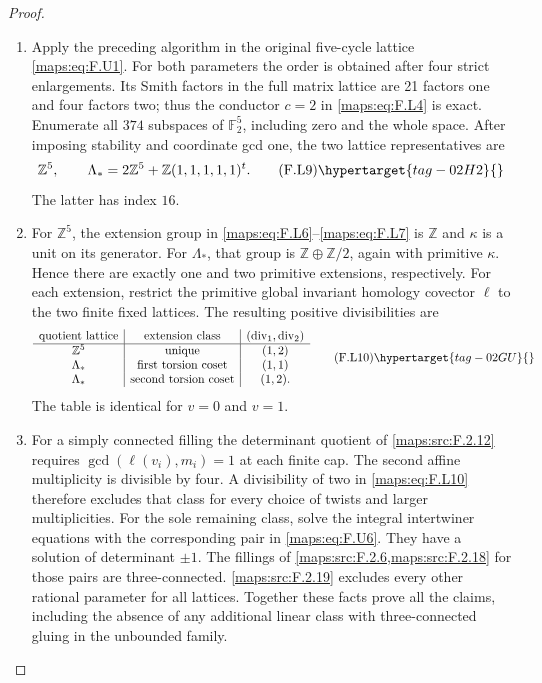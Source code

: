 \begin{proof}
\begin{enumerate}[label={$\langle1\rangle$\arabic*.}]
\item Apply the preceding algorithm in the original five-cycle
lattice \eqref{maps:eq:F.U1}.  For both parameters the order is obtained
after four strict enlargements.  Its Smith factors in the
full matrix lattice are 21 factors one and four factors two;
thus the conductor $c=2$ in \eqref{maps:eq:F.L4} is exact.
Enumerate all $374$ subspaces of $\mathbb F_2^5$, including zero
and the whole space.
After imposing stability and coordinate gcd one, the two
lattice representatives are
\[
 \mathbb Z^5,\qquad
 \Lambda_* =2\mathbb Z^5+\mathbb Z(1,1,1,1,1)^t.
 \tag{F.L9}\hypertarget{tag-02H2}{}\label{maps:eq:F.L9}
\]
The latter has index $16$.

\item For $\mathbb Z^5$, the extension group in \eqref{maps:eq:F.L6}--\eqref{maps:eq:F.L7}
is $\mathbb Z$ and $\kappa$ is a unit on its generator.
For $\Lambda_*$, that group is
$\mathbb Z\oplus\mathbb Z/2$, again with primitive
$\kappa$.  Hence there are exactly one and two primitive
extensions, respectively.
For each extension, restrict the primitive global invariant homology
covector $\ell$ to the two finite fixed lattices. The resulting
positive divisibilities are
\[
\begin{array}{c|c|c}
 \text{quotient lattice}&\text{extension class}&
       (\operatorname{div}_1,\operatorname{div}_2)\\\hline
 \mathbb Z^5&\text{unique}&(1,2)\\
 \Lambda_*&\text{first torsion coset}&(1,1)\\
 \Lambda_*&\text{second torsion coset}&(1,2).
\end{array}
 \tag{F.L10}\hypertarget{tag-02GU}{}\label{maps:eq:F.L10}
\]
The table is identical for $v=0$ and $v=1$.

\item For a simply connected filling the determinant quotient
of \ref{maps:src:F.2.12} requires $\gcd(\ell(v_i),m_i)=1$ at each
finite cap.  The second affine multiplicity is divisible
by four.  A divisibility of two in \eqref{maps:eq:F.L10} therefore
excludes that class for every choice of twists and larger
multiplicities.
For the sole remaining class, solve the integral intertwiner
equations with the corresponding pair in \eqref{maps:eq:F.U6}.
They have a solution of determinant $\pm1$. The fillings of
\cref{maps:src:F.2.6,maps:src:F.2.18} for those pairs are three-connected.  \ref{maps:src:F.2.19} excludes every other
rational parameter for all lattices.
Together these facts prove all the claims, including the
absence of any additional linear class with three-connected gluing in the
unbounded family.

\end{enumerate}
\end{proof}




